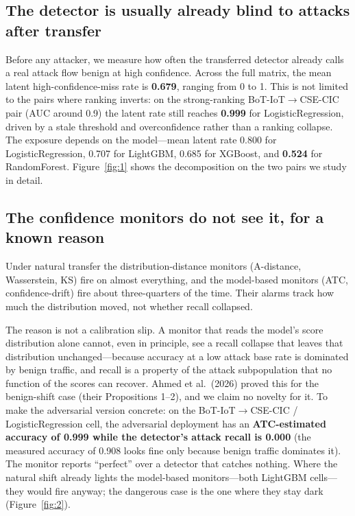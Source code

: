 \documentclass[11pt]{article}
\begin{document}
\subsection{The detector is usually already blind to attacks after transfer}
Before any attacker, we measure how often the transferred detector already calls a real attack flow benign at high confidence. Across the full matrix, the mean latent high-confidence-miss rate is \textbf{0.679}, ranging from 0 to 1. This is not limited to the pairs where ranking inverts: on the strong-ranking BoT-IoT$\to$CSE-CIC pair (AUC around 0.9) the latent rate still reaches \textbf{0.999} for LogisticRegression, driven by a stale threshold and overconfidence rather than a ranking collapse. The exposure depends on the model---mean latent rate 0.800 for LogisticRegression, 0.707 for LightGBM, 0.685 for XGBoost, and \textbf{0.524} for RandomForest. Figure~\ref{fig:1} shows the decomposition on the two pairs we study in detail.

\subsection{The confidence monitors do not see it, for a known reason}\label{sec:blind}
Under natural transfer the distribution-distance monitors (A-distance, Wasserstein, KS) fire on almost everything, and the model-based monitors (ATC, confidence-drift) fire about three-quarters of the time. Their alarms track how much the distribution moved, not whether recall collapsed.

The reason is not a calibration slip. A monitor that reads the model's score distribution alone cannot, even in principle, see a recall collapse that leaves that distribution unchanged---because accuracy at a low attack base rate is dominated by benign traffic, and recall is a property of the attack subpopulation that no function of the scores can recover. Ahmed et al.\ (2026) proved this for the benign-shift case (their Propositions 1--2), and we claim no novelty for it. To make the adversarial version concrete: on the BoT-IoT$\to$CSE-CIC / LogisticRegression cell, the adversarial deployment has an \textbf{ATC-estimated accuracy of 0.999 while the detector's attack recall is 0.000} (the measured accuracy of 0.908 looks fine only because benign traffic dominates it). The monitor reports ``perfect'' over a detector that catches nothing. Where the natural shift already lights the model-based monitors---both LightGBM cells---they would fire anyway; the dangerous case is the one where they stay dark (Figure~\ref{fig:2}).
\end{document}
